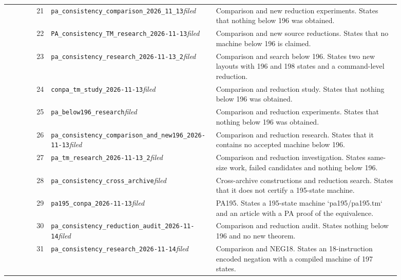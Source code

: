 \begin{longtable}{@{}rp{0.42\linewidth}p{0.47\linewidth}@{}}
21 & \nolinkurl{pa_consistency_comparison_2026_11_13}\newline\emph{filed} & Comparison and new reduction experiments. States that nothing below 196 was obtained. \\[2pt]
22 & \nolinkurl{PA_consistency_TM_research_2026-11-13}\newline\emph{filed} & Comparison and new source reductions. States that no machine below 196 is claimed. \\[2pt]
23 & \nolinkurl{pa_consistency_research_2026-11-13_2}\newline\emph{filed} & Comparison and search below 196. States two new layouts with 196 and 198 states and a command-level reduction. \\[2pt]
24 & \nolinkurl{conpa_tm_study_2026-11-13}\newline\emph{filed} & Comparison and reduction study. States that nothing below 196 was obtained. \\[2pt]
25 & \nolinkurl{pa_below196_research}\newline\emph{filed} & Comparison and reduction experiments. States that nothing below 196 was obtained. \\[2pt]
26 & \nolinkurl{pa_consistency_comparison_and_new196_2026-11-13}\newline\emph{filed} & Comparison and reduction research. States that it contains no accepted machine below 196. \\[2pt]
27 & \nolinkurl{pa_tm_research_2026-11-13_2}\newline\emph{filed} & Comparison and reduction investigation. States same-size work, failed candidates and nothing below 196. \\[2pt]
28 & \nolinkurl{pa_consistency_cross_archive}\newline\emph{filed} & Cross-archive constructions and reduction search. States that it does not certify a 195-state machine. \\[2pt]
29 & \nolinkurl{pa195_conpa_2026-11-13}\newline\emph{filed} & PA195. States a 195-state machine `pa195/pa195.tm` and an article with a PA proof of the equivalence. \\[2pt]
30 & \nolinkurl{pa_consistency_reduction_audit_2026-11-14}\newline\emph{filed} & Comparison and reduction audit. States nothing below 196 and no new theorem. \\[2pt]
31 & \nolinkurl{pa_consistency_research_2026-11-14}\newline\emph{filed} & Comparison and NEG18. States an 18-instruction encoded negation with a compiled machine of 197 states. \\[2pt]

\end{longtable}
